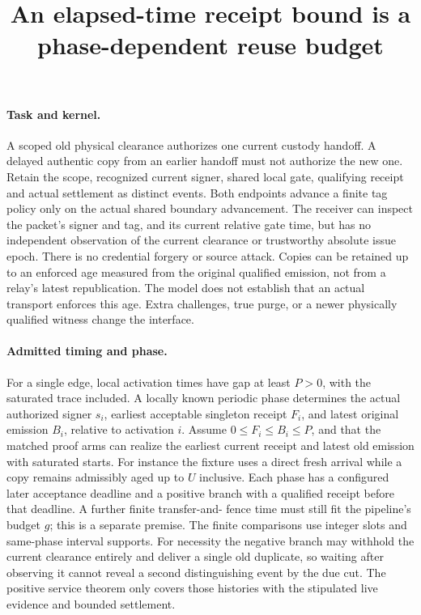 \documentclass[11pt]{article}
\title{An elapsed-time receipt bound is a phase-dependent reuse budget}
\begin{document}
\maketitle
\paragraph{Task and kernel.}
A scoped old physical clearance authorizes one current custody
handoff. A delayed authentic copy from an earlier handoff must
not authorize the new one. Retain the scope, recognized current
signer, shared local gate, qualifying receipt and actual
settlement as distinct events. Both endpoints advance a finite
tag policy only on the actual shared boundary advancement.
The receiver can inspect the packet's signer and tag, and
its current relative gate time, but has no independent
observation of the current clearance or trustworthy absolute
issue epoch. There is no credential forgery or source attack.
Copies can be retained up to an enforced age measured from
the original qualified emission, not from a relay's latest
republication. The model does not establish that an actual
transport enforces this age. Extra challenges, true purge, or
a newer physically qualified witness change the interface.

\paragraph{Admitted timing and phase.}
For a single edge, local activation times have gap at least
\(P>0\), with the saturated trace included. A locally known
periodic phase determines the actual authorized signer \(s_i\),
earliest acceptable singleton receipt \(F_i\), and latest
original emission \(B_i\), relative to activation \(i\).
Assume \(0\le F_i\le B_i\le P\), and that the matched proof
arms can realize the earliest current receipt and latest old
emission with saturated starts. For instance the fixture uses
a direct fresh arrival while a copy remains admissibly aged
up to \(U\) inclusive. Each phase has a configured later
acceptance deadline and a positive branch with a qualified
receipt before that deadline. A further finite transfer-and-
fence time must still fit the pipeline's budget \(g\); this
is a separate premise. The finite comparisons use integer
slots and same-phase interval supports. For necessity the
negative branch may withhold the current clearance entirely
and deliver a single old duplicate, so waiting after observing
it cannot reveal a second distinguishing event by the due cut.
The positive service theorem only covers those histories
with the stipulated live evidence and bounded settlement.
\end{document}
